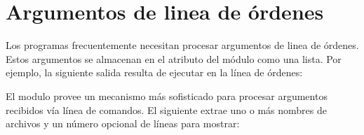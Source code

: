 \documentclass[a5paper,10pt,spanish]{sphinxmanual}
\begin{document}
\section{Argumentos de linea de órdenes}
\label{\detokenize{tutorial/stdlib:command-line-arguments}}\label{\detokenize{tutorial/stdlib:tut-command-line-arguments}}
\sphinxAtStartPar
Los programas frecuentemente necesitan procesar argumentos de linea de órdenes. Estos argumentos se almacenan en el atributo  del módulo  como una lista.  Por ejemplo, la siguiente salida resulta de ejecutar  en la línea de órdenes:

\begin{sphinxVerbatim}[commandchars=\\\{\}]
 
\end{sphinxVerbatim}

\sphinxAtStartPar
El modulo  provee un mecanismo más sofisticado para procesar argumentos recibidos vía línea de comandos. El siguiente  extrae uno o más nombres de archivos y un número opcional de líneas para mostrar:

\begin{sphinxVerbatim}[commandchars=\\\{\}]
 

    
      
 
   
  
\end{sphinxVerbatim}
\end{document}
